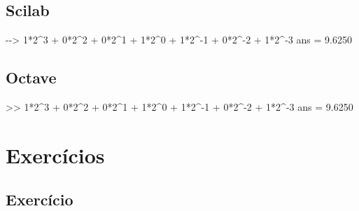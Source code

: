 \documentclass[
  a4paper,
  DIV=11,
  numbers=noendperiod,
  oneside]{scrreprt}
\newenvironment{Shaded}{\begin{snugshade}}{\end{snugshade}}
\newcommand{\DecValTok}[1]{\textcolor[rgb]{0.68,0.00,0.00}{#1}}
\newcommand{\FloatTok}[1]{\textcolor[rgb]{0.68,0.00,0.00}{#1}}
\newcommand{\FunctionTok}[1]{\textcolor[rgb]{0.28,0.35,0.67}{#1}}
\newcommand{\NormalTok}[1]{\textcolor[rgb]{0.00,0.23,0.31}{#1}}
\newcommand{\OperatorTok}[1]{\textcolor[rgb]{0.37,0.37,0.37}{#1}}
\begin{document}
\subsection{Scilab}

\begin{Shaded}
\begin{Highlighting}[]
\NormalTok{{-}{-}\textgreater{} }\DecValTok{1}\NormalTok{*}\DecValTok{2}\NormalTok{\^{}}\DecValTok{3}\NormalTok{ + }\DecValTok{0}\NormalTok{*}\DecValTok{2}\NormalTok{\^{}}\DecValTok{2}\NormalTok{ + }\DecValTok{0}\NormalTok{*}\DecValTok{2}\NormalTok{\^{}}\DecValTok{1}\NormalTok{ + }\DecValTok{1}\NormalTok{*}\DecValTok{2}\NormalTok{\^{}}\DecValTok{0}\NormalTok{ + }\DecValTok{1}\NormalTok{*}\DecValTok{2}\NormalTok{\^{}{-}}\DecValTok{1}\NormalTok{ + }\DecValTok{0}\NormalTok{*}\DecValTok{2}\NormalTok{\^{}{-}}\DecValTok{2}\NormalTok{ + }\DecValTok{1}\NormalTok{*}\DecValTok{2}\NormalTok{\^{}{-}}\DecValTok{3}
\FunctionTok{ans}\NormalTok{ =  }\FloatTok{9.6250}
\end{Highlighting}
\end{Shaded}

\subsection{Octave}

\begin{Shaded}
\begin{Highlighting}[]
\OperatorTok{\textgreater{}\textgreater{}} \FloatTok{1}\OperatorTok{*}\FloatTok{2}\OperatorTok{\^{}}\FloatTok{3} \OperatorTok{+} \FloatTok{0}\OperatorTok{*}\FloatTok{2}\OperatorTok{\^{}}\FloatTok{2} \OperatorTok{+} \FloatTok{0}\OperatorTok{*}\FloatTok{2}\OperatorTok{\^{}}\FloatTok{1} \OperatorTok{+} \FloatTok{1}\OperatorTok{*}\FloatTok{2}\OperatorTok{\^{}}\FloatTok{0} \OperatorTok{+} \FloatTok{1}\OperatorTok{*}\FloatTok{2}\OperatorTok{\^{}{-}}\FloatTok{1} \OperatorTok{+} \FloatTok{0}\OperatorTok{*}\FloatTok{2}\OperatorTok{\^{}{-}}\FloatTok{2} \OperatorTok{+} \FloatTok{1}\OperatorTok{*}\FloatTok{2}\OperatorTok{\^{}{-}}\FloatTok{3}
\FunctionTok{ans} \OperatorTok{=}  \FloatTok{9.6250}
\end{Highlighting}
\end{Shaded}

\section{Exercícios}\label{exercuxedcios}

\subsection{Exercício}\label{exercuxedcio}
\end{document}
